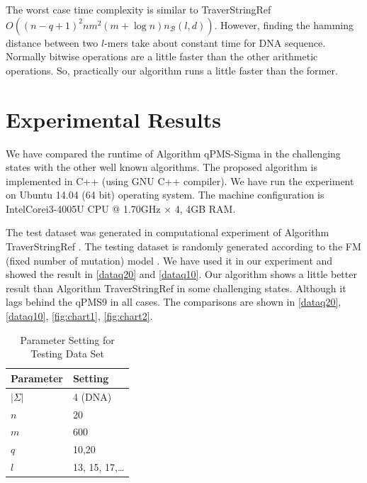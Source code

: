 {The worst case time complexity is similar to TraverStringRef $O((n-q+1)^2 nm^2 (m+\log n)n_\mathcal{B} (l,d))$. However, finding the hamming distance between two $l$-mers take about constant time for DNA sequence. Normally bitwise operations are a little faster than the other arithmetic operations. So, practically our algorithm runs a little faster than the former.

\section{Experimental Results}
We have compared the runtime of Algorithm qPMS-Sigma in the challenging states with the other well known algorithms. The proposed algorithm is implemented in C++ (using GNU C++ compiler). We have run the experiment on Ubuntu 14.04 (64 bit) operating system. The machine configuration is Intel\textregistered Core\texttrademark i3-4005U CPU @ 1.70GHz × 4, 4GB RAM.

The test dataset was generated in computational experiment of Algorithm TraverStringRef \cite{tanaka2014improved}. The testing dataset is randomly generated according to the FM (fixed number of mutation) model \cite{pevzner2000combinatorial}. We have used it in our experiment and showed the result in \cref{dataq20} and \cref{dataq10}. Our algorithm shows a little better result than Algorithm TraverStringRef in some challenging
states. Although it lags behind the qPMS9 in all cases. The comparisons are shown in \cref{dataq20}, \cref{dataq10}, \cref{fig:chart1}, \cref{fig:chart2}.

\begin{table}
	\begin{center}
		\caption{Parameter Setting for Testing Data Set}
		\label{dataset_parameter}
		\begin{tabular}{|ll|}
			\hline 
			Parameter
			& Setting\\
			\hline
			$|\Sigma|$
			& 4 (DNA)\\
			$n$
			& 20 \\
			$m$
			& 600 \\
			$q$
			& 10,20\\
			$l$
			& 13, 15, 17,\dots \\
			\hline
		\end{tabular}
	\end{center}
\end{table}

}
